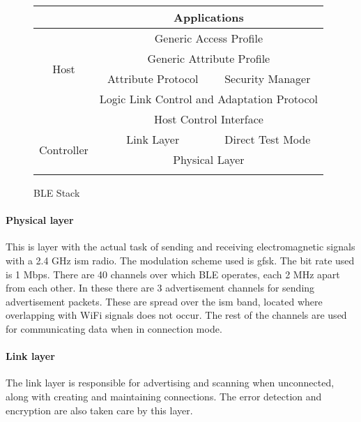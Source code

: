 \begin{figure}[h]
\begin{center}
\setlength{\extrarowheight}{1.5pt}
\begin{tabular}{|c||c|c|}
\cline{2-3}
\multicolumn{1}{c|}{} &  \multicolumn{ 2}{c|}{Applications} \\ \hline
\multirow{4}{*}{Host} & \multicolumn{ 2}{c|}{Generic Access Profile} \\ \cline{ 2- 3}
 & \multicolumn{ 2}{c|}{Generic Attribute Profile} \\ \cline{ 2- 3}
 & \multicolumn{1}{c|}{Attribute Protocol} & \multicolumn{1}{c|}{Security Manager} \\ \cline{ 2- 3}
 & \multicolumn{ 2}{c|}{Logic Link Control and Adaptation Protocol} \\ \hline 
\multicolumn{1}{c|}{} & \multicolumn{ 2}{c|}{Host Control Interface} \\ \hline
\multirow{2}{*}{Controller} & \multicolumn{1}{c|}{Link Layer} & \multicolumn{1}{c|}{Direct Test Mode} \\ \cline{ 2- 3}
 & \multicolumn{ 2}{c|}{Physical Layer} \\ \hline
\multicolumn{ 1}{c}{} & \multicolumn{1}{m{4cm}}{} & \multicolumn{1}{m{4cm}}{} \\ 
\end{tabular}
\end{center}
\vspace{-30pt}
\caption{BLE Stack}
\label{fig:StackBLE}
\vspace{-10pt}
\end{figure}

\paragraph{Physical layer}
This is layer with the actual task of sending and receiving electromagnetic signals with a 2.4 GHz \gls{ism} radio. The modulation scheme used is \gls{gfsk}. The bit rate used is 1 Mbps. There are 40 channels over which BLE operates, each 2 MHz apart from each other. In these there are 3 advertisement channels for sending advertisement packets. These are spread over the \gls{ism} band, located where overlapping with WiFi signals does not occur. The rest of the channels are used for communicating data when in connection mode.

\paragraph{Link layer}
The link layer is responsible for advertising and scanning when unconnected, along with creating and maintaining connections. The error detection and encryption are also taken care by this layer. 

